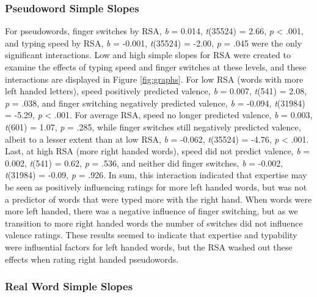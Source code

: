 \documentclass[english,man]{apa6}
\theoremstyle{definition}
\theoremstyle{definition}
\theoremstyle{definition}
\theoremstyle{remark}
\begin{document}
\subsubsection{Pseudoword Simple Slopes}\label{pseudoword-simple-slopes}

For pseudowords, finger switches by RSA, \emph{b} = 0.014,
\emph{t}(35524) = 2.66, \emph{p} \textless{} .001, and typing speed by
RSA, \emph{b} = -0.001, \emph{t}(35524) = -2.00, \emph{p} = .045 were
the only significant interactions. Low and high simple slopes for RSA
were created to examine the effects of typing speed and finger switches
at these levels, and these interactions are displayed in Figure
\ref{fig:graphs}. For low RSA (words with more left handed letters),
speed positively predicted valence, \emph{b} = 0.007, \emph{t}(541) =
2.08, \emph{p} = .038, and finger switching negatively predicted
valence, \emph{b} = -0.094, \emph{t}(31984) = -5.29, \emph{p}
\textless{} .001. For average RSA, speed no longer predicted valence,
\emph{b} = 0.003, \emph{t}(601) = 1.07, \emph{p} = .285, while finger
switches still negatively predicted valence, albeit to a lesser extent
than at low RSA, \emph{b} = -0.062, \emph{t}(35524) = -4.76, \emph{p}
\textless{} .001. Last, at high RSA (more right handed words), speed did
not predict valence, \emph{b} = 0.002, \emph{t}(541) = 0.62, \emph{p} =
.536, and neither did finger switches, \emph{b} = -0.002,
\emph{t}(31984) = -0.09, \emph{p} = .926. In sum, this interaction
indicated that expertise may be seen as positively influencing ratings
for more left handed words, but was not a predictor of words that were
typed more with the right hand. When words were more left handed, there
was a negative influence of finger switching, but as we transition to
more right handed words the number of switches did not influence valence
ratings. These results seemed to indicate that expertise and typability
were influential factors for left handed words, but the RSA washed out
these effects when rating right handed pseudowords.

\subsubsection{Real Word Simple Slopes}\label{real-word-simple-slopes}
\end{document}
